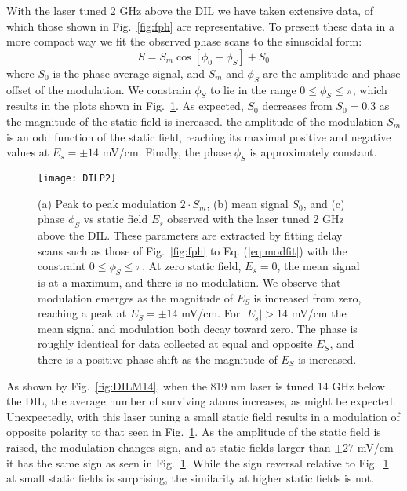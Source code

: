 \documentclass[aps,pra,reprint,groupedaddress]{revtex4-1}
\begin{document}
With the laser tuned 2 GHz above the DIL we have taken extensive data, of which those shown in Fig.~\ref{fig:fph} are representative. To present these data in a more compact way we fit the observed phase scans to the sinusoidal form:
\begin{equation} \label{eq:modfit}
S = S_m \cos{[\phi_0 - \phi_S]} + S_0
\end{equation}
where $S_0$ is the phase average signal, and $S_m$ and $\phi_S$ are the amplitude and phase offset of the modulation. We constrain $\phi_S$ to lie in the range $0\leq \phi_S \leq \pi$, which results in the plots shown in Fig.~\ref{fig:DILP2}. As expected, $S_0$ decreases from $S_0=0.3$  as the magnitude of the static field is increased. the amplitude of the modulation $S_m$ is an odd function of the static field, reaching its maximal positive and negative values at $E_s=\pm 14$ mV/cm. Finally, the phase $\phi_S$ is approximately constant.

\begin{figure}
	\texttt{[image: DILP2]}
	\caption{(a) Peak to peak modulation $2 \cdot S_m$, (b) mean signal $S_0$, and (c) phase $\phi_S$ vs static field $E_s$ observed with the laser tuned 2 GHz above the DIL. These parameters are extracted by fitting delay scans such as those of Fig.~\ref{fig:fph} to Eq. (\ref{eq:modfit}) with the constraint $0 \leq \phi_S \leq \pi$. At zero static field, $E_s = 0$, the mean signal is at a maximum, and there is no modulation. We observe that modulation emerges as the magnitude of $E_S$ is increased from zero, reaching a peak at $E_S = \pm 14$ mV/cm. For $|E_s| > 14$ mV/cm the mean signal and modulation both decay toward zero. The phase is roughly identical for data collected at equal and opposite $E_S$, and there is a positive phase shift as the magnitude of $E_S$ is increased.}
	\label{fig:DILP2}
\end{figure}

As shown by Fig.~\ref{fig:DILM14}, when the 819 nm laser is tuned 14 GHz below the DIL, the average number of surviving atoms increases, as might be expected. Unexpectedly, with this laser tuning a small static field results in a modulation of opposite polarity to that seen in Fig.~\ref{fig:DILP2}. As the amplitude of the static field is raised, the modulation changes sign, and at static fields larger than $\pm 27$ mV/cm it has the same sign as seen in Fig.~\ref{fig:DILP2}. While the sign reversal relative to Fig.~\ref{fig:DILP2} at small static fields is surprising, the similarity at higher static fields is not.
\end{document}

